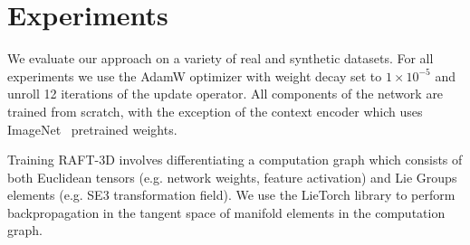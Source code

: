 \documentclass[final]{cvpr}
\begin{document}
\begin{table*}
\centering
{}
\caption{Results on the FlyingThings3D dataset using the images from the FlowNet3D split. We evaluate on the full images (excluding pixels at infinity and extremely fast moving regions with flow $>250$px)}
\label{table:FlyingThingsResults}
\end{table*}

\section{Experiments}

We evaluate our approach on a variety of real and synthetic datasets. For all experiments we use the AdamW optimizer\cite{loshchilov2017decoupled} with weight decay set to $1\times10^{-5}$ and unroll 12 iterations of the update operator. All components of the network are trained from scratch, with the exception of the context encoder which uses ImageNet~\cite{deng2009imagenet} pretrained weights. 

Training RAFT-3D involves differentiating a computation graph which consists of both Euclidean tensors (e.g. network weights, feature activation) and Lie Groups elements (e.g. SE3 transformation field). We use the LieTorch library\cite{teed2021tangent} to perform backpropagation in the tangent space of manifold elements in the computation graph.
\end{document}
